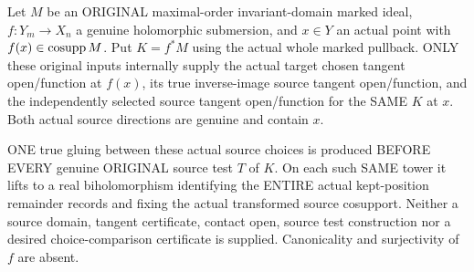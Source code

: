 \begin{theorem}
\label{hir:original-smooth-independent-source-contact-choice-producer}
\leanok
Let $M$ be an ORIGINAL maximal-order invariant-domain marked ideal,
$f:Y_m\to X_n$ a genuine holomorphic submersion, and $x\in Y$ an actual
point with $f(x)\in\operatorname{cosupp} M$. Put $K=f^*M$ using the actual whole marked
pullback. ONLY these original inputs internally supply the actual target
chosen tangent open/function at $f(x)$, its true inverse-image source
tangent open/function, and the independently selected source tangent
open/function for the SAME $K$ at $x$. Both actual source directions are
genuine and contain $x$.

ONE true gluing between these actual source choices is produced BEFORE
EVERY genuine ORIGINAL source test $T$ of $K$. On each such SAME tower
it lifts to a real biholomorphism identifying the ENTIRE actual
kept-position remainder records and fixing the actual transformed source
cosupport. Neither a source domain, tangent certificate, contact open,
source test construction nor a desired choice-comparison certificate is
supplied. Canonicality and surjectivity of $f$ are absent.
\end{theorem}
